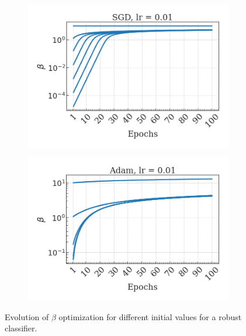 \begin{figure}[H]
    \centering
    \begin{subfigure}[b]{0.45\textwidth}
        \centering
        \includegraphics[width=\textwidth]{img/results_discussion/empirical/rob_met=betas_hue=beta0_opt=sgd_lr=0.01.png}
    \end{subfigure}
    \hfill
    \begin{subfigure}[b]{0.45\textwidth}
        \centering
        \includegraphics[width=\textwidth]{img/results_discussion/empirical/rob_met=betas_hue=beta0_opt=adam_lr=0.01.png}
    \end{subfigure}
    \caption{Evolution of $\beta$ optimization for different initial values for a robust classifier.}
\end{figure}

